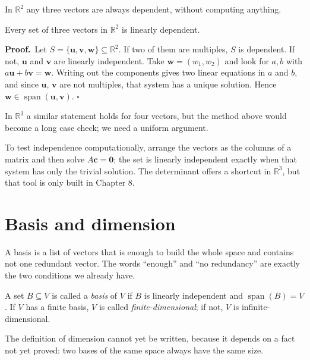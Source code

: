 In $\mathbb{R}^{2}$ any three vectors are always dependent, without computing anything.

\begin{proposisi}
Every set of three vectors in $\mathbb{R}^{2}$ is linearly dependent.
\end{proposisi}

\par\medskip\noindent\textbf{Proof.}\ 
Let $S=\{\mathbf{u},\mathbf{v},\mathbf{w}\}\subseteq\mathbb{R}^{2}$. If two of them are multiples,
$S$ is dependent. If not, $\mathbf{u}$ and $\mathbf{v}$ are linearly independent. Take
$\mathbf{w}=(w_{1},w_{2})$ and look for $a,b$ with
$a\mathbf{u}+b\mathbf{v}=\mathbf{w}$. Writing out the components gives two linear equations in
$a$ and $b$, and since $\mathbf{u}$, $\mathbf{v}$ are not multiples, that system has a unique
solution. Hence $\mathbf{w}\in\operatorname{span}(\mathbf{u},\mathbf{v})$.
\hfill$\square$\par\medskip

In $\mathbb{R}^{3}$ a similar statement holds for four vectors, but the method above would become
a long case check; we need a uniform argument.

To test independence computationally, arrange the vectors as the columns of a matrix and then
solve $A\mathbf{c}=\mathbf{0}$; the set is linearly independent exactly when that system has only
the trivial solution. The determinant offers a shortcut in $\mathbb{R}^{3}$, but that tool is only
built in Chapter 8.

\section{Basis and dimension}

A basis is a list of vectors that is enough to build the whole space and contains not one
redundant vector. The words ``enough'' and ``no redundancy'' are exactly the two conditions we
already have.

\begin{definisi}
A set $B\subseteq V$ is called a \emph{basis} of $V$ if $B$ is linearly independent and
$\operatorname{span}(B)=V$. If $V$ has a finite basis, $V$ is called
\emph{finite-dimensional}; if not, $V$ is infinite-dimensional.
\end{definisi}

The definition of dimension cannot yet be written, because it depends on a fact not yet proved:
two bases of the same space always have the same size.

